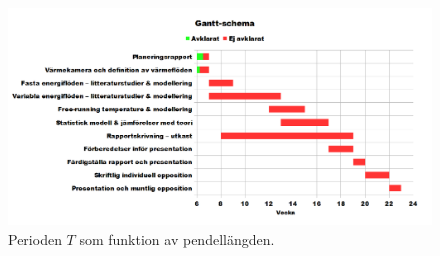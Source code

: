 \restoregeometry

\begin{figure}\centering
\includegraphics[scale=0.8, angle=270]{Gantt.png}
\caption{\label{figuren} Perioden $T$ som funktion av pendellängden.}
\end{figure}

